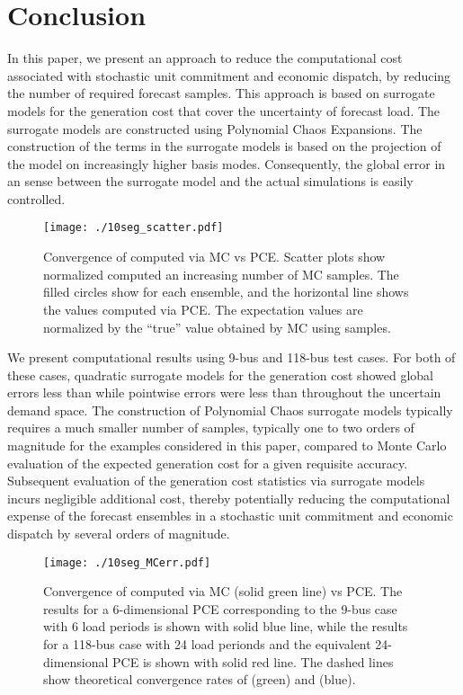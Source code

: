\documentclass[conference]{IEEEtran}
\begin{document}
\section{Conclusion}
\label{sec:conclusion}

In this paper, we present an approach to reduce the computational cost
associated with stochastic unit commitment and economic dispatch, by
reducing the number of required forecast samples.
This approach is based on surrogate
models for the generation cost that cover the uncertainty of forecast
load. The surrogate models are constructed using Polynomial Chaos
Expansions. The construction of the terms in the surrogate models is
based on the projection of the model on increasingly higher basis
modes. Consequently, the global error in an  sense between the surrogate
model and the actual simulations is easily controlled.

\begin{figure}[t]
\centering
\texttt{[image: ./10seg\_scatter.pdf]}
\caption{\label{fig:pcst} Convergence of  computed via MC vs PCE.
  Scatter plots show normalized  computed an increasing number of MC
  samples. The filled circles show  for each ensemble, and
  the horizontal line shows the values computed via PCE. The
  expectation values are normalized by the ``true'' value obtained by
  MC using  samples.} 
\end{figure}

We present computational results using 9-bus and 118-bus test cases. For
both of these cases, quadratic surrogate models for the generation cost
showed global  errors less than  while pointwise errors
were less than  throughout the uncertain demand space. The
construction of Polynomial Chaos surrogate models typically requires
a much smaller number of samples, typically one to two orders of
magnitude for the examples considered in this paper,
compared to Monte Carlo evaluation of the expected generation cost for
a given requisite accuracy.
Subsequent evaluation of the
generation cost statistics via surrogate models incurs negligible
additional cost, thereby potentially reducing the computational
expense of the forecast ensembles in a stochastic unit commitment and
economic dispatch by several orders of magnitude.

\begin{figure}[t]
\centering
\texttt{[image: ./10seg\_MCerr.pdf]}
\caption{\label{fig:conv} Convergence of  computed via MC (solid green line)
  vs PCE. The results for a 6-dimensional PCE corresponding to
  the 9-bus case with 6 load periods is shown with solid blue line, while the results for
  a 118-bus case with 24 load perionds and the equivalent 24-dimensional PCE is
  shown with solid red line. The dashed lines show theoretical
  convergence rates of  (green) and  (blue).}
\end{figure}
\end{document}
